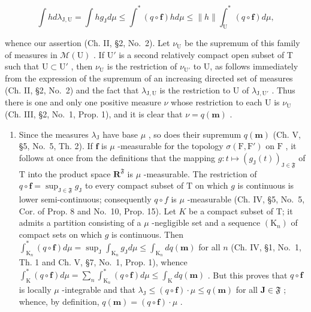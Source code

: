 \[
\int h d \lambda_ {\mathrm{J}, \mathrm{U}} = \int h g _ {\mathrm{J}} d \mu \leqslant \int^ {*} (q \circ \mathbf {f}) h d \mu \leqslant \| h \| \int_ {\mathrm{U}} ^ {*} (q \circ \mathbf {f}) d \mu ,
\]

whence our assertion (Ch. II, §2, No.~2). Let \(\nu_{\mathrm{U}}\) be the supremum of this family of measures in \(\mathcal{M}(\mathrm{U})\) . If \(\mathrm{U}'\) is a second relatively compact open subset of T such that \(\mathrm{U} \subset \mathrm{U}'\) , then \(\nu_{\mathrm{U}}\) is the restriction of \(\nu_{\mathrm{U}'}\) to U, as follows immediately from the expression of the supremum of an increasing directed set of measures (Ch. II, §2, No.~2) and the fact that \(\lambda_{\mathrm{J,U}}\) is the restriction to U of \(\lambda_{\mathrm{J,U}'}\) . Thus there is one and only one positive measure \(\nu\) whose restriction to each U is \(\nu_{\mathrm{U}}\) (Ch. III, §2, No.~1, Prop. 1), and it is clear that \(\nu = q(\mathbf{m})\) .

\begin{enumerate}
\def\labelenumi{\alph{enumi})}
\setcounter{enumi}{1}
\tightlist
\item
  Since the measures \(\lambda_{\mathrm{J}}\) have base \(\mu\) , so does their supremum \(q(\mathbf{m})\) (Ch. V, §5, No.~5, Th. 2). If \(\mathbf{f}\) is \(\mu\) -measurable for the topology \(\sigma(\mathrm{F},\mathrm{F}')\) on \(\mathrm{F}\) , it follows at once from the definitions that the mapping \(g:t\mapsto(g_{\mathrm{J}}(t))_{\mathrm{J}\in\mathfrak{F}}\) of \(\mathrm{T}\) into the product space \(\mathbf{R}^{\mathfrak{F}}\) is \(\mu\) -measurable. The restriction of \(q\circ\mathbf{f}=\sup_{\mathrm{J}\in\mathfrak{F}}g_{\mathrm{J}}\) to every compact subset of \(\mathrm{T}\) on which \(g\) is continuous is lower semi-continuous; consequently \(q \circ f\) is \(\mu\) -measurable (Ch. IV, §5, No.~5, Cor. of Prop. 8 and No.~10, Prop. 15). Let \(K\) be a compact subset of T; it admits a partition consisting of a \(\mu\) -negligible set and a sequence \((\mathrm{K}_n)\) of compact sets on which \(g\) is continuous. Then \(\int_{\mathrm{K}_n}^*\left(q\circ \mathbf{f}\right)d\mu = \sup_{\mathrm{J}}\int_{\mathrm{K}_n}g_{\mathrm{J}}d\mu \leqslant \int_{\mathrm{K}_n}dq(\mathbf{m})\) for all \(n\) (Ch. IV, §1, No.~1, Th. 1 and Ch. V, §7, No.~1, Prop. 1), whence \(\int_{\mathrm{K}}^{*}(q\circ \mathbf{f})d\mu = \sum_{n}\int_{\mathrm{K}_n}^*\left(q\circ \mathbf{f}\right)d\mu \leqslant \int_{\mathrm{K}}dq(\mathbf{m})\) . But this proves that \(q\circ \mathbf{f}\) is locally \(\mu\) -integrable and that \(\lambda_{\mathrm{J}}\leqslant (q\circ \mathbf{f})\cdot \mu \leqslant q(\mathbf{m})\) for all \(\mathbf{J}\in \mathfrak{F}\) ; whence, by definition, \(q(\mathbf{m}) = (q\circ \mathbf{f})\cdot \mu\) .
\end{enumerate}

